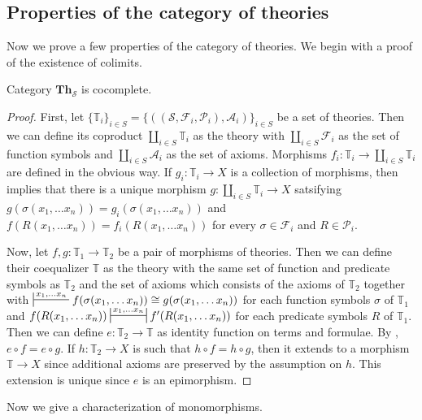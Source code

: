 \documentclass[reqno]{amsart}
\theoremstyle{definition}
\theoremstyle{remark}
\newcommand{\cat}[1]{\mathbf{#1}}
\newcommand{\Th}{\cat{Th}}
\numberwithin{figure}{section}
\begin{document}
\subsection{Properties of the category of theories}

Now we prove a few properties of the category of theories.
We begin with a proof of the existence of colimits.

\begin{prop}
Category $\Th_\mathcal{S}$ is cocomplete.
\end{prop}
\begin{proof}
First, let $\{ \mathbb{T}_i \}_{i \in S} = \{ ((\mathcal{S},\mathcal{F}_i,\mathcal{P}_i),\mathcal{A}_i) \}_{i \in S}$ be a set of theories.
Then we can define its coproduct $\coprod\limits_{i \in S} \mathbb{T}_i$ as the theory with $\coprod\limits_{i \in S} \mathcal{F}_i$ as the set of function symbols and $\coprod\limits_{i \in S} \mathcal{A}_i$ as the set of axioms.
Morphisms $f_i : \mathbb{T}_i \to \coprod\limits_{i \in S} \mathbb{T}_i$ are defined in the obvious way.
If $g_i : \mathbb{T}_i \to X$ is a collection of morphisms, then  implies that there is a unique morphism $g : \coprod\limits_{i \in S} \mathbb{T}_i \to X$
    satsifying $g(\sigma(x_1, \ldots x_n)) = g_i(\sigma(x_1, \ldots x_n))$ and $f(R(x_1, \ldots x_n)) = f_i(R(x_1, \ldots x_n))$
    for every $\sigma \in \mathcal{F}_i$ and $R \in \mathcal{P}_i$.

Now, let $f,g : \mathbb{T}_1 \to \mathbb{T}_2$ be a pair of morphisms of theories.
Then we can define their coequalizer $\mathbb{T}$ as the theory with the same set of function and predicate symbols as $\mathbb{T}_2$ and the set of axioms which consists of the axioms of $\mathbb{T}_2$
together with $\sststile{}{x_1, \ldots x_n} f(\sigma(x_1, \ldots x_n)) \cong g(\sigma(x_1, \ldots x_n))$ for each function symbols $\sigma$ of $\mathbb{T}_1$
and $f(R(x_1, \ldots x_n)) \ssststile{}{x_1, \ldots x_n} f'(R(x_1, \ldots x_n))$ for each predicate symbols $R$ of $\mathbb{T}_1$.
Then we can define $e : \mathbb{T}_2 \to \mathbb{T}$ as identity function on terms and formulae.
By , $e \circ f = e \circ g$.
If $h : \mathbb{T}_2 \to X$ is such that $h \circ f = h \circ g$, then it extends to a morphism $\mathbb{T} \to X$ since additional axioms are preserved by the assumption on $h$.
This extension is unique since $e$ is an epimorphism.
\end{proof}

Now we give a characterization of monomorphisms.
\end{document}
